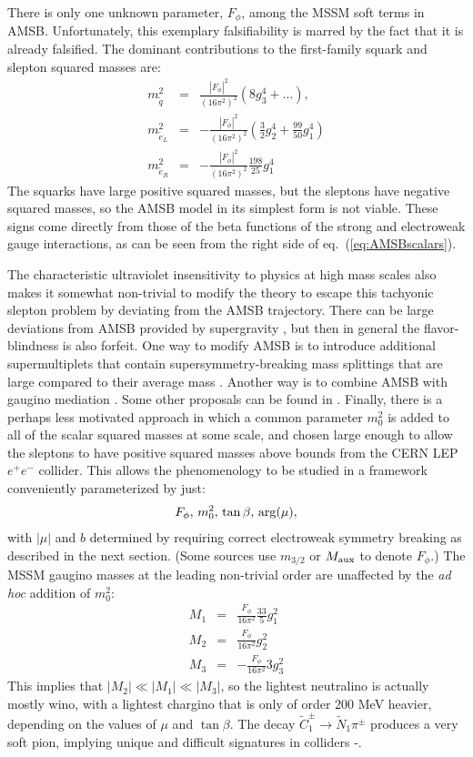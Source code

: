 \documentclass[11pt]{article}
\def\beq{\begin{eqnarray}}
\def\eeq{\end{eqnarray}}
\def\stilde{\widetilde}
\def\mAMSB{F_\phi}
\begin{document}
There is only one unknown parameter, $\mAMSB$, among the MSSM soft terms 
in AMSB. Unfortunately, this exemplary falsifiability is 
marred by the fact that it is already falsified. The dominant 
contributions to the first-family squark and slepton squared masses are:
\beq
m^2_{\tilde q} &= & \frac{|\mAMSB|^2}{(16 \pi^2)^2} 
\left (8 g_3^4  + \ldots \right ),
\\
m^2_{\tilde e_L} &= & -\frac{|\mAMSB|^2}{(16 \pi^2)^2} 
\left (\frac{3}{2} g_2^4 + \frac{99}{50} g_1^4 \right )
\\
m^2_{\tilde e_R} &= & 
-\frac{|\mAMSB|^2}{(16 \pi^2)^2} \frac{198}{25} g_1^4
\eeq
The squarks have large positive squared masses, but the sleptons have 
negative squared masses, so the AMSB model in its simplest form is not 
viable. These signs come directly from those of the beta functions of the 
strong and electroweak gauge interactions, as can be seen from the 
right side of eq.~(\ref{eq:AMSBscalars}).

The characteristic ultraviolet insensitivity to physics at high mass 
scales also makes it somewhat non-trivial to modify the theory to escape 
this tachyonic slepton problem by deviating from the AMSB trajectory. There 
can be large deviations from AMSB provided by supergravity 
\cite{isAMSBrobust}, but then in general the flavor-blindness is also 
forfeit. One way to modify AMSB is to introduce additional supermultiplets 
that contain supersymmetry-breaking mass splittings that are large 
compared to their average mass \cite{AMSBlightstates}. Another way is to 
combine AMSB with gaugino mediation \cite{AMSBhybrid}. Some other 
proposals can be found in \cite{otherAMSBattempts}. Finally, there is a 
perhaps less motivated approach in which a common 
parameter $m_0^2$ is added to all of the scalar squared masses at some 
scale, and chosen large enough to allow the sleptons to have positive 
squared masses above bounds from the CERN LEP $e^+e^-$ collider. 
This allows the phenomenology to be 
studied in a framework conveniently parameterized by just:
\beq
\mAMSB,\, m^2_0,\, \tan\beta,\, {\rm arg}(\mu),
\eeq 
with $|\mu|$ and $b$ determined by requiring correct electroweak symmetry 
breaking as described in the next section. (Some sources use $m_{3/2}$ or 
$M_{\rm aux}$ to denote $ \mAMSB$.) The MSSM gaugino masses at the leading 
non-trivial order are unaffected by the {\it ad hoc} addition of $m_0^2$:
\beq
M_1 &=& \frac{\mAMSB}{16 \pi^2} \frac{33}{5} g_1^2
\\
M_2 &=& \frac{\mAMSB}{16 \pi^2} g_2^2
\\
M_3 &=& -\frac{\mAMSB}{16 \pi^2} 3 g_3^2
\eeq
This implies that $|M_2| \ll |M_1| \ll |M_3|$, so the lightest neutralino 
is actually mostly wino, with a lightest chargino that is only of order 
200 MeV heavier, depending on the values of $\mu$ and $\tan\beta$.
The decay $\stilde C_1^\pm \rightarrow \stilde N_1 \pi^\pm$ 
produces a very soft pion, implying
unique and difficult signatures in colliders 
\cite{Chen:1996ap}-\cite{AMSBphenothree}. 
\end{document}
